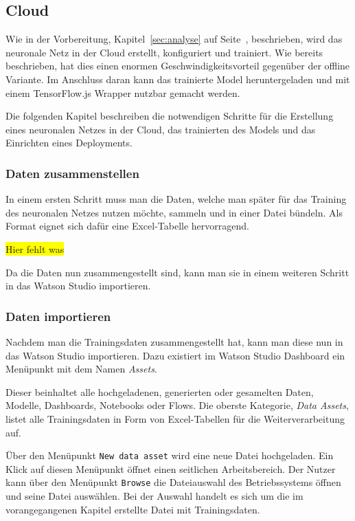\subsection{Cloud}
Wie in der Vorbereitung, Kapitel~\ref{sec:analyse} auf Seite~\pageref{sec:analyse}, beschrieben, wird das neuronale Netz
in der Cloud erstellt, konfiguriert und trainiert. Wie bereits beschrieben, hat dies einen enormen Geschwindigkeitsvorteil
gegenüber der offline Variante. Im Anschluss daran kann das trainierte Model heruntergeladen und mit einem
TensorFlow.js Wrapper nutzbar gemacht werden.

Die folgenden Kapitel beschreiben die notwendigen Schritte für die Erstellung eines neuronalen Netzes in der Cloud, das
trainierten des Models und das Einrichten eines Deployments.

\subsubsection{Daten zusammenstellen}
In einem ersten Schritt muss man die Daten, welche man später für das Training des neuronalen Netzes nutzen möchte,
sammeln und in einer Datei bündeln. Als Format eignet sich dafür eine Excel-Tabelle hervorragend.

\colorbox{yellow}{Hier fehlt was}

Da die Daten nun zusammengestellt sind, kann man sie in einem weiteren Schritt in das Watson Studio importieren.

\subsubsection{Daten importieren}
Nachdem man die Trainingsdaten zusammengestellt hat, kann man diese nun in das Watson Studio importieren. Dazu existiert
im Watson Studio Dashboard ein Menüpunkt mit dem Namen \textit{Assets}.

Dieser beinhaltet alle hochgeladenen, generierten oder gesamelten Daten, Modelle, Dashboards, Notebooks oder Flows. Die
oberste Kategorie, \textit{Data Assets}, listet alle Trainingsdaten in Form von Excel-Tabellen für die Weiterverarbeitung
auf.

Über den Menüpunkt \texttt{New data asset} wird eine neue Datei hochgeladen. Ein Klick auf diesen Menüpunkt öffnet einen
seitlichen Arbeitsbereich. Der Nutzer kann über den Menüpunkt \texttt{Browse} die Dateiauswahl des Betriebssystems
öffnen und seine Datei auswählen. Bei der Auswahl handelt es sich um die im vorangegangenen Kapitel erstellte Datei mit
Trainingsdaten.

